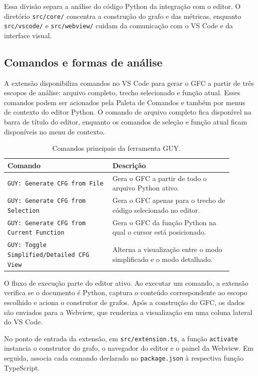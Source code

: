 Essa divisão separa a análise do código Python da integração com o editor. O diretório \texttt{src/core/} concentra a construção do grafo e das métricas, enquanto \texttt{src/vscode/} e \texttt{src/webview/} cuidam da comunicação com o VS Code e da interface visual.

\subsection{Comandos e formas de análise}

A extensão disponibiliza comandos no VS Code para gerar o GFC a partir de três escopos de análise: arquivo completo, trecho selecionado e função atual. Esses comandos podem ser acionados pela Paleta de Comandos e também por menus de contexto do editor Python. O comando de arquivo completo fica disponível na barra de título do editor, enquanto os comandos de seleção e função atual ficam disponíveis no menu de contexto.

\begin{table}[H]
    \centering
    \caption{Comandos principais da ferramenta GUY.}
    \begin{tabular}{p{0.42\linewidth} | p{0.48\linewidth}}
        \hline
        \textbf{Comando} & \textbf{Descrição} \\ \hline
        \texttt{GUY: Generate CFG from File} & Gera o GFC a partir de todo o arquivo Python ativo. \\ \hline
        \texttt{GUY: Generate CFG from Selection} & Gera o GFC apenas para o trecho de código selecionado no editor. \\ \hline
        \texttt{GUY: Generate CFG from Current Function} & Gera o GFC da função Python na qual o cursor está posicionado. \\ \hline
        \texttt{GUY: Toggle Simplified/Detailed CFG View} & Alterna a visualização entre o modo simplificado e o modo detalhado. \\ \hline
    \end{tabular}
    \label{tab:comandos_guy}
\end{table}

O fluxo de execução parte do editor ativo. Ao executar um comando, a extensão verifica se o documento é Python, captura o conteúdo correspondente ao escopo escolhido e aciona o construtor de grafos. Após a construção do GFC, os dados são enviados para a Webview, que renderiza a visualização em uma coluna lateral do VS Code.

No ponto de entrada da extensão, em \texttt{src/extension.ts}, a função \texttt{activate} instancia o construtor do grafo, o navegador do editor e o painel da Webview. Em seguida, associa cada comando declarado no \texttt{package.json} à respectiva função TypeScript.

